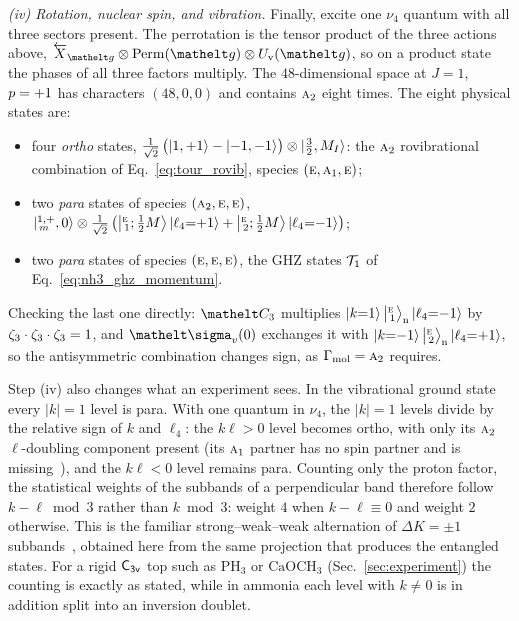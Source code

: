\emph{(iv) Rotation, nuclear spin, and vibration.} Finally, excite one $\nu_4$ quantum with all three sectors present. The perrotation is the tensor product of the three actions above, $\cev X_{\gel}\otimes\mathrm{Perm}(\gel)\otimes U_{\mathrm{v}}(\gel)$, so on a product state the phases of all three factors multiply. The $48$-dimensional space at $J=1$, $p=+1$ has characters $(48,0,0)$ and contains $\text{\normalfont\scshape a}_{2}$ eight times. The eight physical states are:
\begin{itemize}
\item four \emph{ortho} states, $\tfrac{1}{\sqrt{2}}\,\bigl(\ket{1,{+1}}-\ket{{-1},{-1}}\bigr)\otimes\ket{\tfrac32,M_I}$: the $\text{\normalfont\scshape a}_{2}$ rovibrational combination of Eq.~\eqref{eq:tour_rovib}, species $(\text{\normalfont\scshape e},\text{\normalfont\scshape a}_{1},\text{\normalfont\scshape e})$;
\item two \emph{para} states of species $(\text{\normalfont\scshape a}_{2},\text{\normalfont\scshape e},\text{\normalfont\scshape e})$, $\ket{{}^{1,+}_{\,m},0}\otimes\tfrac{1}{\sqrt{2}}\,\bigl(\bigl\lvert{}^{\text{\normalfont\scshape e}}_{\,1};\tfrac12M\bigr\rangle\ket{\ell_4{=}{+1}}+\bigl\lvert{}^{\text{\normalfont\scshape e}}_{\,2};\tfrac12M\bigr\rangle\ket{\ell_4{=}{-1}}\bigr)$;
\item two \emph{para} states of species $(\text{\normalfont\scshape e},\text{\normalfont\scshape e},\text{\normalfont\scshape e})$, the GHZ states $\mathcal{T}_{1}$ of Eq.~\eqref{eq:nh3_ghz_momentum}.
\end{itemize}
Checking the last one directly: $\elt{C_{3}}$ multiplies $\ket{k{=}1}\bigl\lvert{}^{\text{\normalfont\scshape e}}_{\,1}\bigr\rangle_{\mathrm{n}}\ket{\ell_4{=}{-1}}$ by $\zeta_{3}\cdot\zeta_{3}\cdot\zeta_{3}=1$, and $\elt{\sigma_{v}}(0)$ exchanges it with $\ket{k{=}{-1}}\bigl\lvert{}^{\text{\normalfont\scshape e}}_{\,2}\bigr\rangle_{\mathrm{n}}\ket{\ell_4{=}{+1}}$, so the antisymmetric combination changes sign, as $\Gamma_{\mathrm{mol}}=\text{\normalfont\scshape a}_{2}$ requires. 

Step (iv) also changes what an experiment sees. In the vibrational ground state every $|k|=1$ level is para. With one quantum in $\nu_4$, the $|k|=1$ levels divide by the relative sign of $k$ and $\ell_4$: the $k\ell>0$ level becomes ortho, with only its $\text{\normalfont\scshape a}_{2}$ $\ell$-doubling component present (its $\text{\normalfont\scshape a}_{1}$ partner has no spin partner and is missing~\cite{Oka1973}), and the $k\ell<0$ level remains para. Counting only the proton factor, the statistical weights of the subbands of a perpendicular band therefore follow $k-\ell\bmod3$ rather than $k\bmod3$: weight $4$ when $k-\ell\equiv0$ and weight $2$ otherwise. This is the familiar strong--weak--weak alternation of $\Delta K=\pm1$ subbands~\cite{Hougen1962}, obtained here from the same projection that produces the entangled states. For a rigid $\mathsf{C_{3v}}$ top such as $\mathrm{PH_3}$ or $\mathrm{CaOCH_3}$ (Sec.~\ref{sec:experiment}) the counting is exactly as stated, while in ammonia each level with $k\neq0$ is in addition split into an inversion doublet.

